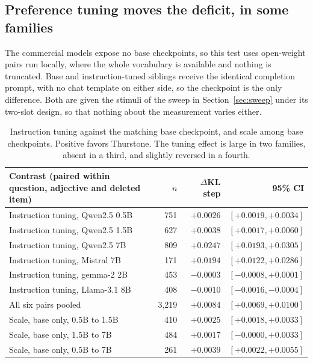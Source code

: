 \documentclass[11pt]{article}
\begin{document}
\subsection{Preference tuning moves the deficit, in some families}
\label{sec:tuning}

The commercial models expose no base checkpoints, so this test uses
open-weight pairs run locally, where the whole vocabulary is available and
nothing is truncated. Base and instruction-tuned siblings receive the
identical completion prompt, with no chat template on either side, so the
checkpoint is the only difference. Both are given the stimuli of the sweep in Section~\ref{sec:sweep} under its
two-slot design, so that nothing about the measurement varies either.

\begin{table}[ht]
\centering
\small
\begin{tabular}{lrrr}
\toprule
Contrast (paired within question, adjective and deleted item) & $n$ & $\Delta$KL step & 95\% CI \\
\midrule
Instruction tuning, Qwen2.5 0.5B & 751 & $+0.0026$ & $[+0.0019, +0.0034]$ \\
Instruction tuning, Qwen2.5 1.5B & 627 & $+0.0038$ & $[+0.0017, +0.0060]$ \\
Instruction tuning, Qwen2.5 7B & 809 & $+0.0247$ & $[+0.0193, +0.0305]$ \\
Instruction tuning, Mistral 7B & 171 & $+0.0194$ & $[+0.0122, +0.0286]$ \\
Instruction tuning, gemma-2 2B & 453 & $-0.0003$ & $[-0.0008, +0.0001]$ \\
Instruction tuning, Llama-3.1 8B & 408 & $-0.0010$ & $[-0.0016, -0.0004]$ \\
\midrule
All six pairs pooled & 3{,}219 & $+0.0084$ & $[+0.0069, +0.0100]$ \\
\midrule
Scale, base only, 0.5B to 1.5B & 410 & $+0.0025$ & $[+0.0018, +0.0033]$ \\
Scale, base only, 1.5B to 7B & 484 & $+0.0017$ & $[-0.0000, +0.0033]$ \\
Scale, base only, 0.5B to 7B & 261 & $+0.0039$ & $[+0.0022, +0.0055]$ \\
\bottomrule
\end{tabular}
\caption{Instruction tuning against the matching base checkpoint, and scale
among base checkpoints. Positive favors Thurstone. The tuning effect is large
in two families, absent in a third, and slightly reversed in a fourth.}
\label{tab:tuning}
\end{table}
\end{document}
